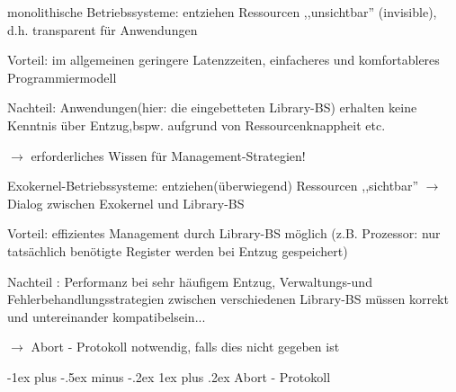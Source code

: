\documentclass[a4paper]{article}
\makeatletter
\renewcommand{\subsubsection}{\@startsection{subsubsection}{3}{0mm}%
 {-1ex plus -.5ex minus -.2ex}%
 {1ex plus .2ex}%
 {\normalfont\small\bfseries}}
\makeatother
\begin{document}
\begin{multicols}{3}
    \begin{itemize*}
        \item monolithische Betriebssysteme: entziehen Ressourcen ,,unsichtbar''
        (invisible), d.h. transparent für Anwendungen
        \begin{itemize*}
            \item Vorteil: im allgemeinen geringere Latenzzeiten, einfacheres und komfortableres Programmiermodell
            \item Nachteil: Anwendungen(hier: die eingebetteten Library-BS) erhalten keine Kenntnis über Entzug,bspw. aufgrund von Ressourcenknappheit etc.
            \item[$\rightarrow$] erforderliches Wissen für Management-Strategien!
        \end{itemize*}
        \item Exokernel-Betriebssysteme: entziehen(überwiegend) Ressourcen
        ,,sichtbar'' $\rightarrow$ Dialog zwischen Exokernel
        und Library-BS
        \begin{itemize*}
            \item Vorteil: effizientes Management durch Library-BS möglich (z.B. Prozessor: nur tatsächlich benötigte Register werden bei Entzug gespeichert)
            \item Nachteil : Performanz bei sehr häufigem Entzug, Verwaltungs-und Fehlerbehandlungsstrategien zwischen verschiedenen Library-BS müssen korrekt und untereinander kompatibelsein...
            \item[$\rightarrow$] Abort - Protokoll notwendig, falls dies nicht gegeben ist
        \end{itemize*}
    \end{itemize*}


    \subsubsection{Abort - Protokoll}


\end{multicols}
\end{document}

